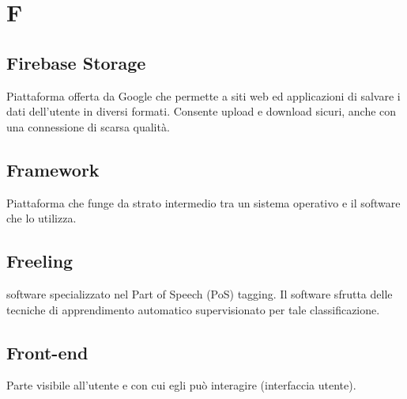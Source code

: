 \section*{F}
\subsection*{Firebase Storage}
Piattaforma offerta da Google che permette a siti web ed applicazioni di salvare i dati dell'utente in diversi formati. Consente upload e download sicuri, anche con una connessione di scarsa qualità.

\subsection*{Framework}
Piattaforma che funge da strato intermedio tra un sistema operativo e il software che lo utilizza.

\subsection*{Freeling}
software specializzato nel Part of Speech (PoS) tagging. Il software sfrutta delle tecniche di apprendimento automatico supervisionato per tale classificazione.  

\subsection*{Front-end}
Parte visibile all'utente e con cui egli può interagire (interfaccia utente).

